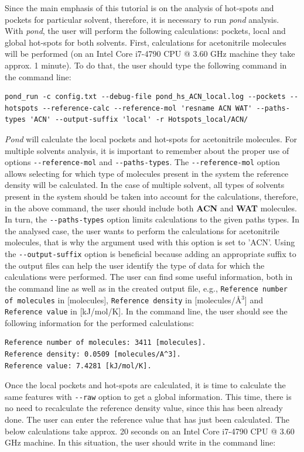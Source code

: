 \documentclass[9pt,tutorial]{livecoms}
\begin{document}
Since the main emphasis of this tutorial is on the analysis of hot-spots and pockets for particular solvent, therefore, it is necessary to run \emph{pond} analysis. With \emph{pond}, the user will perform the following calculations: pockets, local and global hot-spots for both solvents. First, calculations for acetonitrile molecules will be performed (on an Intel Core i7-4790 CPU @ 3.60 GHz machine they take approx. 1 minute). To do that, the user should type the following command in the command line:
\begin{lstlisting}
pond_run -c config.txt --debug-file pond_hs_ACN_local.log --pockets --hotspots --reference-calc --reference-mol 'resname ACN WAT' --paths-types 'ACN' --output-suffix 'local' -r Hotspots_local/ACN/ 
\end{lstlisting}
\emph{Pond} will calculate the local pockets and hot-spots for acetonitrile molecules. For multiple solvents analysis, it is important to remember about the proper use of options \texttt{-{}-reference-mol} and \texttt{-{}-paths-types}. The \texttt{-{}-reference-mol} option allows selecting for which type of molecules present in the system the reference density will be calculated. In the case of multiple solvent, all types of solvents present in the system should be taken into account for the calculations, therefore, in the above command, the user should include both \textbf{ACN} and \textbf{WAT} molecules. In turn, the \texttt{-{}-paths-types} option limits calculations to the given paths types. In the analysed case, the user wants to perform the calculations for acetonitrile molecules, that is why the argument used with this option is set to 'ACN'. Using the \texttt{-{}-output-suffix} option is beneficial because adding an appropriate suffix to the output files can help the user identify the type of data for which the calculations were performed. 
The user can find some useful information, both in the command line as well as in the created output file, e.g., \texttt{Reference number of molecules} in [molecules], \texttt{Reference density} in [molecules/Å\( \displaystyle ^{3}\)] and \texttt{Reference value} in [kJ/mol/K]. In the command line, the user should see the following information for the performed calculations: 
\begin{lstlisting}[columns=fullflexible]
Reference number of molecules: 3411 [molecules].
Reference density: 0.0509 [molecules/A^3].
Reference value: 7.4281 [kJ/mol/K].
\end{lstlisting}
Once the local pockets and hot-spots are calculated, it is time to calculate the same features with \texttt{-{}-raw} option to get a global information. This time, there is no need to recalculate the reference density value, since this has been already done. The user can enter the reference value that has just been calculated. The below calculations take approx. 20 seconds on an Intel Core i7-4790 CPU @ 3.60 GHz machine. In this situation, the user should write in the command line:
\end{document}
